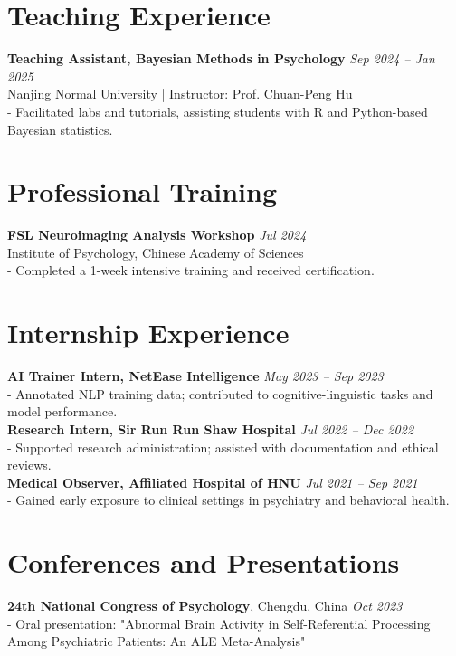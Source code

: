 \documentclass[a4paper,10pt]{article}
\begin{document}
\section*{Teaching Experience}
\noindent
\textbf{Teaching Assistant, Bayesian Methods in Psychology} \hfill \textit{Sep 2024 -- Jan 2025} \\
Nanjing Normal University | Instructor: Prof. Chuan-Peng Hu \\
- Facilitated labs and tutorials, assisting students with R and Python-based Bayesian statistics.

\section*{Professional Training}
\noindent
\textbf{FSL Neuroimaging Analysis Workshop} \hfill \textit{Jul 2024} \\
Institute of Psychology, Chinese Academy of Sciences \\
- Completed a 1-week intensive training and received certification.

\section*{Internship Experience}
\noindent
\textbf{AI Trainer Intern, NetEase Intelligence} \hfill \textit{May 2023 -- Sep 2023} \\
- Annotated NLP training data; contributed to cognitive-linguistic tasks and model performance. \\[0.5em]

\noindent
\textbf{Research Intern, Sir Run Run Shaw Hospital} \hfill \textit{Jul 2022 -- Dec 2022} \\
- Supported research administration; assisted with documentation and ethical reviews. \\[0.5em]

\noindent
\textbf{Medical Observer, Affiliated Hospital of HNU} \hfill \textit{Jul 2021 -- Sep 2021} \\
- Gained early exposure to clinical settings in psychiatry and behavioral health.

\section*{Conferences and Presentations}
\noindent
\textbf{24th National Congress of Psychology}, Chengdu, China \hfill \textit{Oct 2023} \\
- Oral presentation: "Abnormal Brain Activity in Self-Referential Processing Among Psychiatric Patients: An ALE Meta-Analysis" \\[0.5em]
\end{document}
